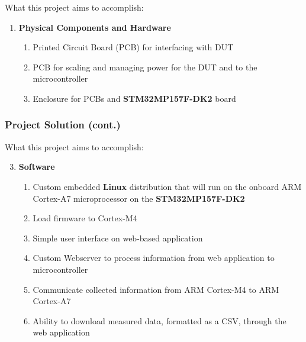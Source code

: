 \documentclass[8pt,compress,aspectratio=169]{beamer}
\newcommand\LightBold[1]{\textcolor{VSBlueLight}{\textbf{#1}}}
\newcommand\DarkBold[1]{\textcolor{VSBlueDark}{\textbf{#1}}}
\begin{document}
\begin{frame}
\begin{block}{What this project aims to accomplish:}
\begin{enumerate}
      \item \DarkBold{Physical Components and Hardware}
        \begin{enumerate}
          \item Printed Circuit Board (PCB) for interfacing with DUT
          \item PCB for scaling and managing power for the DUT and to the microcontroller
          \item Enclosure for PCBs and \LightBold{STM32MP157F-DK2} board
        \end{enumerate}
    \end{enumerate}
  \end{block}
\end{frame}

\begin{frame}
  \frametitle{Project Solution (cont.)}
  \begin{block}{What this project aims to accomplish:}
    \begin{enumerate}
        \setcounter{enumi}{2}
        \large
      \item \DarkBold{Software}
        \begin{enumerate}
            \large
          \item Custom embedded \textbf{Linux} distribution that will run on the onboard ARM Cortex-A7
            microprocessor on the \LightBold{STM32MP157F-DK2}
          \item Load firmware to Cortex-M4
          \item Simple user interface on web-based application
          \item Custom Webserver to process information from web application to microcontroller
          \item Communicate collected information from ARM Cortex-M4 to ARM Cortex-A7
          \item Ability to download measured data, formatted as a CSV, through the web application 
        \end{enumerate}
    \end{enumerate}
  \end{block}
\end{frame}
\end{document}
